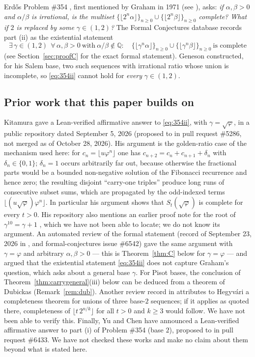 \documentclass[11pt]{amsart}
\theoremstyle{definition}
\theoremstyle{remark}
\newcommand{\Q}{\mathbb{Q}}
\newcommand{\fl}[1]{\lfloor #1\rfloor}
\begin{document}
Erd\H{o}s Problem \#354 \cite{EP354}, first mentioned by Graham in 1971 (see \cite{EP354}),
asks: \emph{if $\alpha,\beta>0$ and $\alpha/\beta$ is irrational, is the multiset
$\{\fl{2^n\alpha}\}_{n\ge0}\cup\{\fl{2^n\beta}\}_{n\ge0}$ complete? What if $2$ is replaced
by some $\gamma\in(1,2)$?} The Formal Conjectures database \cite{FC} records part (ii) as the
existential statement
\begin{equation}\label{eq:354ii}
  \exists\,\gamma\in(1,2)\ \ \forall\,\alpha,\beta>0\ \text{with}\ \alpha/\beta\notin\Q:\quad
  \{\fl{\gamma^n\alpha}\}_{n\ge0}\cup\{\fl{\gamma^n\beta}\}_{n\ge0}\ \text{is complete}
\end{equation}
(see Section~\ref{sec:proofC} for the exact formal statement). Geneson
\cite[Corollary~12]{Gen26} constructed, for his Salem base, two such sequences with irrational
ratio whose union is incomplete, so \eqref{eq:354ii} cannot hold for \emph{every}
$\gamma\in(1,2)$.

\subsection{Prior work that this paper builds on}\label{sec:prior}
Kitamura \cite{Kit26} gave a Lean-verified affirmative answer to \eqref{eq:354ii}, with
$\gamma=\sqrt\varphi$, in a public repository dated September 5, 2026 (proposed to \cite{FC} in
pull request \#5286, not merged as of October 28, 2026). His argument is the golden-ratio case of
the mechanism used here: for $c_n=\fl{u\varphi^n}$ one has $c_{n+2}=c_n+c_{n+1}+\delta_n$ with
$\delta_n\in\{0,1\}$; $\delta_n=1$ occurs arbitrarily far out, because otherwise the fractional
parts would be a bounded non-negative solution of the Fibonacci recurrence and hence zero; the
resulting disjoint ``carry-one triples'' produce long runs of consecutive subset sums, which are
propagated by the odd-indexed terms $\fl{(u\sqrt\varphi)\varphi^n}$. In particular his argument
shows that $S_t(\sqrt\varphi)$ is complete for every $t>0$. His repository also mentions an earlier
proof note for the root of $\gamma^{10}=\gamma+1$ \cite{Kit26}, which we have not been able to
locate; we do not know its argument. An automated review of the formal statement (record of
September 23, 2026 in \cite{Rev26}, and formal-conjectures issue \#6542) gave the same argument
with $\gamma=\varphi$ and arbitrary $\alpha,\beta>0$ --- this is Theorem~\ref{thm:C} below for
$\gamma=\varphi$ --- and argued that the existential statement \eqref{eq:354ii} does not capture
Graham's question, which asks about a general base $\gamma$. For Pisot bases, the conclusion of
Theorem~\ref{thm:carrygeneral}(iii) below can be deduced from a theorem of Dubickas \cite{Dub06}
(Remark~\ref{rem:dub}). Another review record in \cite{Rev26} attributes to Hegyv\'ari
\cite[Theorem~4]{He89} a completeness theorem for unions of three base-$2$ sequences; if it
applies as quoted there, completeness of $\fl{t\,2^{n/k}}$ for all $t>0$ and $k\ge3$ would follow.
We have not been able to verify this. Finally, Yu and Chen \cite{YC26} have announced a
Lean-verified affirmative answer to part (i) of Problem \#354 (base $2$), proposed to \cite{FC}
in pull request \#6433. We have not checked these works and make no claim about them beyond what
is stated here.
\end{document}
